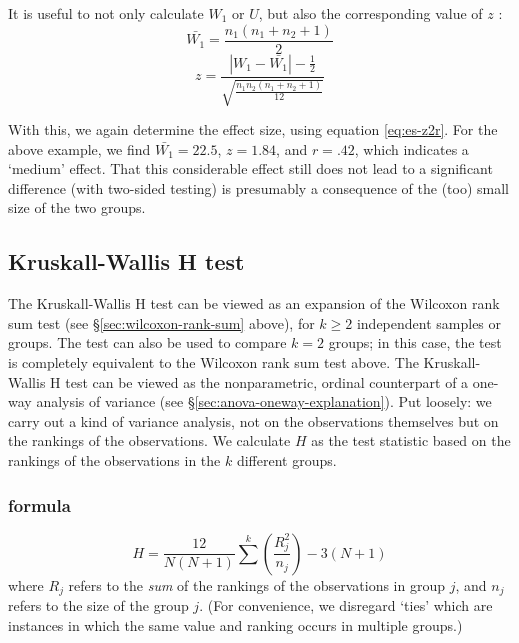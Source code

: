 \documentclass[
]{book}
\begin{document}
It is useful to not only calculate \(W_1\) or \(U\), but also the
corresponding value of \(z\) \citep{Ferg89}:
\begin{equation}
  \label{eq:Wilcoxon-ranksum}
\bar{W_1} = \frac{ n_1 (n_1+n_2+1) }{ 2 }
\end{equation}
\begin{equation}
   \label{eq:Wilcoxon-ranksum-z}
  z = \frac{ |W_1-\bar{W_1}|-\frac{1}{2} }{ \sqrt{ \frac{n_1 n_2 (n_1+n_2+1)}{12} } }
\end{equation}

With this, we again determine the effect size, using equation \eqref{eq:es-z2r}.
For the above example, we find
\(\bar{W_1}=22.5\), \(z=1.84\), and \(r=.42\), which indicates a
`medium' effect. That this considerable effect still does
not lead to a significant difference (with two-sided testing) is presumably
a consequence of the (too) small size of the two groups.

\hypertarget{kruskall-wallis-h-test}{%
\subsection{Kruskall-Wallis H test}\label{kruskall-wallis-h-test}}

The Kruskall-Wallis H test can be viewed as an expansion of the
Wilcoxon rank sum test (see
§\ref{sec:wilcoxon-rank-sum} above), for \(k \ge 2\) independent samples
or groups. The test can also be used to compare \(k=2\) groups;
in this case, the test is completely equivalent to the Wilcoxon rank sum
test above. The Kruskall-Wallis H test can be viewed as the
nonparametric, ordinal counterpart of a one-way analysis of variance
(see §\ref{sec:anova-oneway-explanation}). Put loosely: we carry out a kind of
variance analysis, not on the observations themselves but on the rankings of the
observations. We calculate \(H\) as the test statistic based on the rankings
of the observations in the \(k\) different
groups.

\hypertarget{formula}{%
\subsubsection{formula}\label{formula}}

\begin{equation}
  \label{eq:kruskall-wallis-H}
    H = \frac{12}{N(N+1)} \sum^{k} (\frac{R^2_j}{n_j}) - 3(N+1)
\end{equation}
where \(R_j\) refers to the \emph{sum} of the rankings of the observations
in group \(j\), and \(n_j\) refers to the size of the group \(j\).
(For convenience, we disregard `ties'
which are instances in which the same value and ranking occurs in
multiple groups.)
\end{document}
